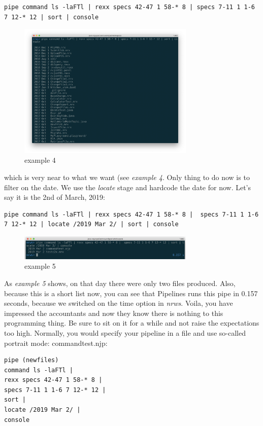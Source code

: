 \begin{lstlisting}
pipe command ls -laFTl | rexx specs 42-47 1 58-* 8 | specs 7-11 1 1-6 7 12-* 12 | sort | console
\end{lstlisting}
\begin{figure}[h]
  \includegraphics[width=0.75\textwidth]{images/example4.png}
  \caption{example 4}
  \label{fig:example4}
\end{figure}
which is very near to what we want (see \emph{example 4}. Only thing to do now is to filter
on the date. We use the \emph{locate} stage and hardcode the date for
now. Let's say it is the 2nd of March, 2019:
\begin{lstlisting}
pipe command ls -laFTl | rexx specs 42-47 1 58-* 8 |  specs 7-11 1 1-6
7 12-* 12 | locate /2019 Mar 2/ | sort | console
\end{lstlisting}
\begin{figure}[h]
  \includegraphics[width=0.75\textwidth]{images/example5.png}
  \caption{example 5}
  \label{fig:example5}
\end{figure}
As \emph{example 5} shows, on that day there were only two files
produced. Also, because this is a short list now, you can see that
Pipelines runs this pipe in 0.157 seconds, because we switched on the
time option in \emph{nrws}.
Voila, you have impressed the accountants and now they know there is nothing to this programming thing. Be sure to sit on it for a while and not raise the expectations too high.
Normally, you would specify your pipeline in a file and use so-called portrait mode:
commandtest.njp:
\begin{lstlisting}
pipe (newfiles)
command ls -laFTl |
rexx specs 42-47 1 58-* 8 |
specs 7-11 1 1-6 7 12-* 12 |
sort |
locate /2019 Mar 2/ |
console
\end{lstlisting}
